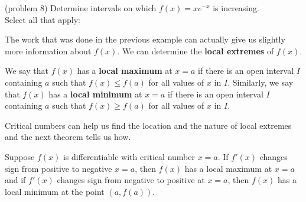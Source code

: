 \documentclass{ximera}
\begin{document}
\begin{problem}(problem 8)
Determine intervals on which $f(x) = xe^{-x}$ is increasing.\\
Select all that apply:
\begin{selectAll}
\end{selectAll}

\end{problem}



The work that was done in the previous example can actually give us slightly more information about $f(x)$.  
We can determine the \textbf{local extremes} of $f(x)$.

\begin{definition}
We say that $f(x)$ has a \textbf{local maximum} at $x = a$ if there is an open interval $I$ containing $a$ 
such that $f(x) \leq f(a)$ for all values of $x$ in $I$.  Similarly, we say that $f(x)$ has a 
\textbf{local minimum} at $x = a$ if there is an open interval $I$ containing $a$ 
such that $f(x) \geq f(a)$ for all values of $x$ in $I$.
\end{definition}

Critical numbers can help us find the location and the nature of local extremes and the next theorem tells us how.

\begin{theorem}[First Derivative Test]
Suppose $f(x)$ is differentiable with critical number $x=a$.
If $f'(x)$ changes sign from positive to negative $x=a$,
 then  $f(x)$ has a local maximum at $x = a$ and
 if $f'(x)$ changes sign from negative to positive at $x=a$,
 then $f(x)$ has a local minimum at the point $(a, f(a))$.
\end{theorem}
 
\end{document}
